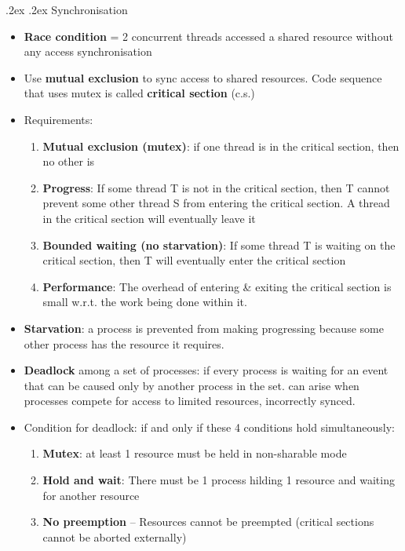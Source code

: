\documentclass[10pt,landscape,a4paper]{article}
\makeatletter
\renewcommand{\subsection}{\@startsection{subsection}{1}{0mm}%
  {.2ex}%
  {.2ex}%
{\sffamily\bfseries}}
\makeatother
\begin{document}
\begin{multicols*}{4}
  \subsection{Synchronisation}
  \begin{itemize}
    \item \textbf{Race condition} = 2 concurrent threads accessed a shared resource without any access synchronisation
    \item Use \textbf{mutual exclusion} to sync access to shared resources. Code sequence that uses mutex is called \textbf{critical section} (c.s.)
    \item Requirements:
    \begin{enumerate}
      \item \textbf{Mutual exclusion (mutex)}: if one thread is in the critical section, then no other is
      \item \textbf{Progress}: If some thread T is not in the critical section, then T cannot prevent some other thread S from entering the critical section. A thread in the critical section will eventually leave it
      \item \textbf{Bounded waiting (no starvation)}: If some thread T is waiting on the critical section, then T will eventually enter the critical section
      \item \textbf{Performance}: The overhead of entering \& exiting the critical section is small w.r.t. the work being done within it.
    \end{enumerate}
    \item \textbf{Starvation}: a process is prevented from making progressing because some other process has the resource it requires.
    \item \textbf{Deadlock} among a set of processes: if every process is waiting for an event that can be caused only by another process in the set. can arise when processes compete for access to limited resources, incorrectly synced.
    \item Condition for deadlock: if and only if these 4 conditions hold simultaneously:
    \begin{enumerate}
      \item \textbf{Mutex}: at least 1 resource must be held in non-sharable mode
      \item \textbf{Hold and wait}: There must be 1 process hilding 1 resource and waiting for another resource
      \item \textbf{No preemption} -- Resources cannot be preempted (critical sections cannot be aborted externally)

\end{enumerate}
\end{itemize}
\end{multicols*}
\end{document}
